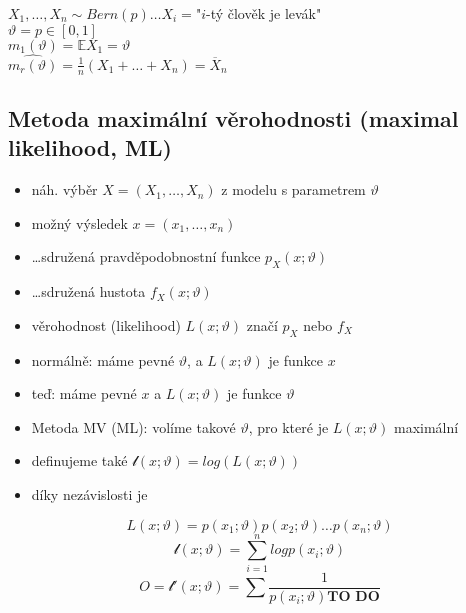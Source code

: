 \documentclass[../main.tex]{subfiles}
\begin{document}
\begin{example}
    $X_1,\dots,X_n \sim Bern(p) \dots X_i = $"$i$-tý člověk je levák"\\
    $\vartheta = p \in \left[0,1\right]$\\
    $m_1(\vartheta) = \mathbb{E}X_1 = \vartheta$\\
    $\widehat{m_r(\vartheta)} = \frac{1}{n}(X_1+\dots+X_n) = \overline{X}_n$
\end{example}

\subsection{Metoda maximální věrohodnosti (maximal likelihood, ML)}
\begin{itemize}
    \item náh. výběr $X = (X_1,\dots,X_n)$ z modelu s parametrem $\vartheta$
    \item možný výsledek $x = (x_1,\dots,x_n)$
    \item \dots sdružená pravděpodobnostní funkce $p_X(x;\vartheta)$
    \item \dots sdružená hustota $f_X(x;\vartheta)$
    \item věrohodnost (likelihood) $L(x;\vartheta)$ značí $p_X$ nebo $f_X$
    \item normálně: máme pevné $\vartheta$, a $L(x;\vartheta)$ je funkce $x$
    \item teď: máme pevné $x$ a $L(x;\vartheta)$ je funkce $\vartheta$
\end{itemize}
\begin{itemize}
    \item Metoda MV (ML): volíme takové $\vartheta$, pro které je $L(x;\vartheta)$ maximální
    \item definujeme také $\mathcal{l}(x;\vartheta) = log(L(x;\vartheta))$
    \item díky nezávislosti je
\end{itemize}
\[L(x;\vartheta) = p(x_1;\vartheta)p(x_2;\vartheta)\dots p(x_n;\vartheta)\]
\[\mathcal{l}(x;\vartheta) = \sum^n_{i=1} log p(x_i;\vartheta)\]
\[ O = \mathcal{l}'(x;\vartheta) = \sum \frac{1}{p(x_i;\vartheta) \textbf{TO DO}}\]
\end{document}
